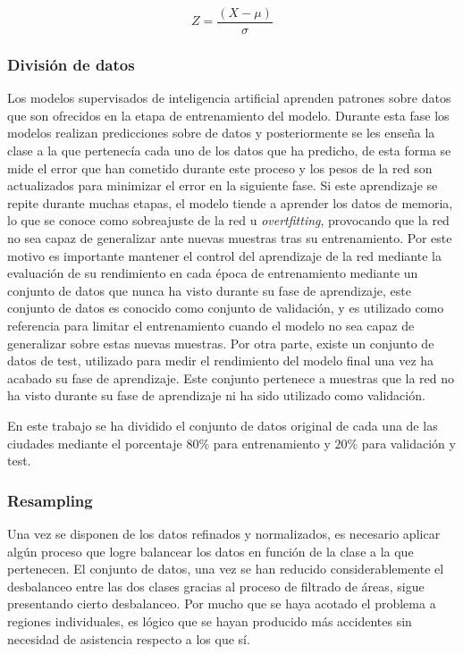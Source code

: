 \begin{equation}
	Z = \frac{(X - \mu)}{\sigma}
\end{equation}


\subsubsection{División de datos}


Los modelos supervisados de inteligencia artificial aprenden patrones sobre datos que son ofrecidos en la etapa de entrenamiento del modelo. Durante esta fase los modelos realizan predicciones sobre de datos y posteriormente se les enseña la clase a la que pertenecía cada uno de los datos que ha predicho, de esta forma se mide el error que han cometido durante este proceso y los pesos de la red son actualizados para minimizar el error en la siguiente fase. Si este aprendizaje se repite durante muchas etapas, el modelo tiende a aprender los datos de memoria, lo que se conoce como sobreajuste de la red u \textit{overtfitting}, provocando que la red no sea capaz de generalizar ante nuevas muestras tras su entrenamiento. Por este motivo es importante mantener el control del aprendizaje de la red mediante la evaluación de su rendimiento en cada época de entrenamiento mediante un conjunto de datos que nunca ha visto durante su fase de aprendizaje, este conjunto de datos es conocido como conjunto de validación, y es utilizado como referencia para limitar el entrenamiento cuando el modelo no sea capaz de generalizar sobre estas nuevas muestras. Por otra parte, existe un conjunto de datos de test, utilizado para medir el rendimiento del modelo final una vez ha acabado su fase de aprendizaje. Este conjunto pertenece a muestras que la red no ha visto durante su fase de aprendizaje ni ha sido utilizado como validación.

En este trabajo se ha dividido el conjunto de datos original de cada una de las ciudades mediante el porcentaje $80\%$ para entrenamiento y $20\%$ para validación y test.

\subsubsection{Resampling}

Una vez se disponen de los datos refinados y normalizados, es necesario aplicar algún proceso que logre balancear los datos en función de la clase a la que pertenecen. El conjunto de datos, una vez se han reducido considerablemente el desbalanceo entre las dos clases gracias al proceso de filtrado de áreas, sigue presentando cierto desbalanceo. Por mucho que se haya acotado el problema a regiones individuales, es lógico que se hayan producido más accidentes sin necesidad de asistencia respecto a los que sí.

